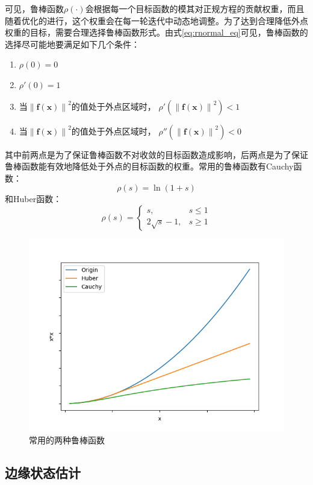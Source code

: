 可见，鲁棒函数$\rho(\cdot)$会根据每一个目标函数的模其对正规方程的贡献权重，而且随着优化的进行，这个权重会在每一轮迭代中动态地调整。为了达到合理降低外点权重的目标，需要合理选择鲁棒函数形式。由式\eqref{eq:rnormal_eq}可见，鲁棒函数的选择尽可能地要满足如下几个条件\citep{triggs1999bundle,zhang1995parameter}：
\begin{enumerate}
    \item $\rho(0)=0$
    \item $\rho'(0)=1$
    \item 当$\left\|\bm{f}(\bm{x})\right\|^2$的值处于外点区域时，
          $\rho'(\left\|\bm{f}(\bm{x})\right\|^2)<1$
    \item 当$\left\|\bm{f}(\bm{x})\right\|^2$的值处于外点区域时，
          $\rho''(\left\|\bm{f}(\bm{x})\right\|^2)<0$
\end{enumerate}
其中前两点是为了保证鲁棒函数不对收敛的目标函数造成影响，后两点是为了保证鲁棒函数能有效地降低处于外点的目标函数的权重。常用的鲁棒函数有Cauchy函数：
\begin{equation}
    \rho(s) = \ln(1+s)
\end{equation}
和Huber函数：
\begin{equation}
    \rho(s) =
    \left\{
    \begin{array}{ll}
        s, & s \leq 1 \\
        2\sqrt{s}-1, & s \geq 1
    \end{array}
    \right.
\end{equation}

\begin{figure}[htb!]
    \centering
    \includegraphics[width=.6\textwidth]{Pictures/robust.png}
    \caption{常用的两种鲁棒函数}
    \label{fig:robust}
\end{figure}

\subsection{边缘状态估计}

